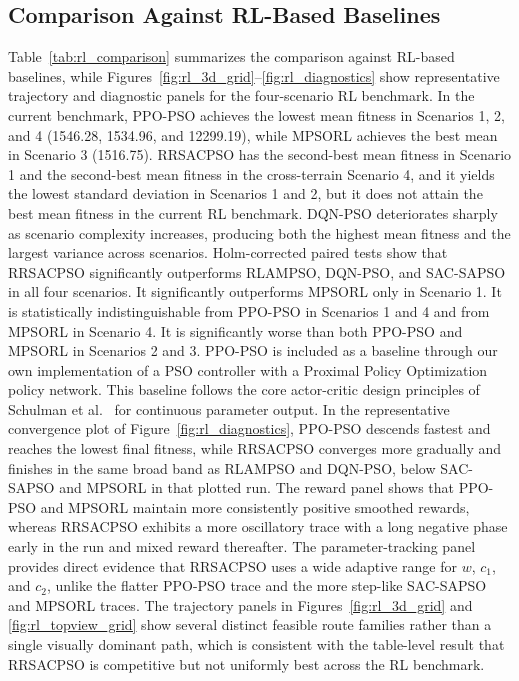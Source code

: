 \documentclass[final,5p,times]{elsarticle}
\begin{document}
\subsection{Comparison Against RL-Based Baselines}
Table~\ref{tab:rl_comparison} summarizes the comparison against RL-based baselines, while Figures~\ref{fig:rl_3d_grid}--\ref{fig:rl_diagnostics} show representative trajectory and diagnostic panels for the four-scenario RL benchmark.
In the current benchmark, PPO-PSO achieves the lowest mean fitness in Scenarios 1, 2, and 4 (1546.28, 1534.96, and 12299.19), while MPSORL achieves the best mean in Scenario 3 (1516.75).
RRSACPSO has the second-best mean fitness in Scenario 1 and the second-best mean fitness in the cross-terrain Scenario 4, and it yields the lowest standard deviation in Scenarios 1 and 2, but it does not attain the best mean fitness in the current RL benchmark.
DQN-PSO deteriorates sharply as scenario complexity increases, producing both the highest mean fitness and the largest variance across scenarios.
Holm-corrected paired tests show that RRSACPSO significantly outperforms RLAMPSO, DQN-PSO, and SAC-SAPSO in all four scenarios.
It significantly outperforms MPSORL only in Scenario 1.
It is statistically indistinguishable from PPO-PSO in Scenarios 1 and 4 and from MPSORL in Scenario 4.
It is significantly worse than both PPO-PSO and MPSORL in Scenarios 2 and 3.
PPO-PSO is included as a baseline through our own implementation of a PSO controller with a Proximal Policy Optimization policy network.
This baseline follows the core actor-critic design principles of Schulman et al.\ \cite{Schulman2017Proximal} for continuous parameter output.
In the representative convergence plot of Figure~\ref{fig:rl_diagnostics}, PPO-PSO descends fastest and reaches the lowest final fitness, while RRSACPSO converges more gradually and finishes in the same broad band as RLAMPSO and DQN-PSO, below SAC-SAPSO and MPSORL in that plotted run.
The reward panel shows that PPO-PSO and MPSORL maintain more consistently positive smoothed rewards, whereas RRSACPSO exhibits a more oscillatory trace with a long negative phase early in the run and mixed reward thereafter.
The parameter-tracking panel provides direct evidence that RRSACPSO uses a wide adaptive range for $w$, $c_1$, and $c_2$, unlike the flatter PPO-PSO trace and the more step-like SAC-SAPSO and MPSORL traces.
The trajectory panels in Figures~\ref{fig:rl_3d_grid} and \ref{fig:rl_topview_grid} show several distinct feasible route families rather than a single visually dominant path, which is consistent with the table-level result that RRSACPSO is competitive but not uniformly best across the RL benchmark.
\end{document}
